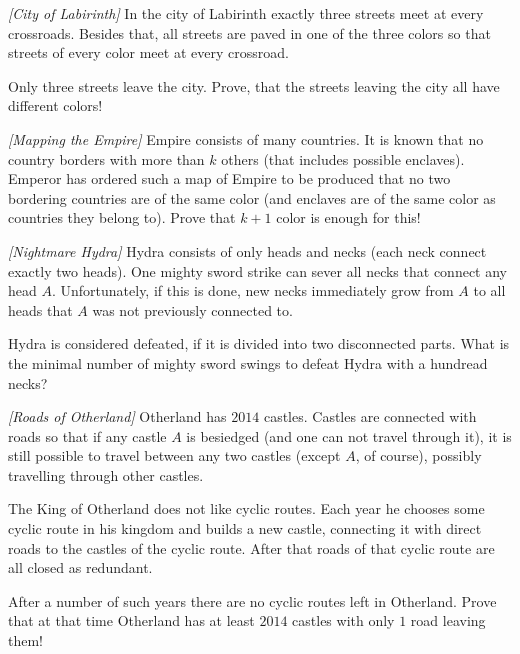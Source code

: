 \begin{problem}
\textit{[City of Labirinth]}
In the city of Labirinth exactly three streets meet at every crossroads. Besides that, all streets are paved in one of the three colors so that streets of every color meet at every crossroad.
 
Only three streets leave the city. Prove, that the streets leaving the city all have different colors! 
\end{problem}
%

\begin{problem}
\textit{[Mapping the Empire]}
Empire consists of many countries. It is known that no country borders with more than $k$ others (that includes possible enclaves). Emperor has ordered such a map of Empire to be produced that no two bordering countries are of the same color (and enclaves are of the same color as countries they belong to). Prove that $k+1$ color is enough for this!
\end{problem}
%

\begin{problem}
\textit{[Nightmare Hydra]}
Hydra consists of only heads and necks (each neck connect exactly two heads). One mighty sword strike can sever all necks that connect any head $A$. Unfortunately, if this is done, new necks immediately grow from $A$ to all heads that $A$ was not previously connected to.

Hydra is considered defeated, if it is divided into two disconnected parts. What is the minimal number of mighty sword swings to defeat Hydra with a hundread necks?
\end{problem}
%

\begin{problem}
\textit{[Roads of Otherland]}
Otherland has $2014$ castles. Castles are connected with roads so that if any castle $A$ is besiedged (and one can not travel through it), it is still possible to travel between any two castles (except $A$, of course), possibly travelling through other castles. 

The King of Otherland does not like cyclic routes. Each year he chooses some cyclic route in his kingdom and builds a new castle, connecting it with direct roads to the castles of the cyclic route. After that roads of that cyclic route are all closed as redundant.

After a number of such years there are no cyclic routes left in Otherland. Prove that at that time Otherland has at least $2014$ castles with only $1$ road leaving them!
\end{problem}
%

